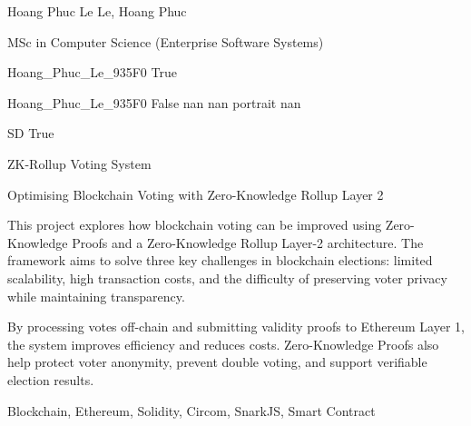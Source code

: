 
\begingroup{}\relax



\def\Key{Hoang_Phuc_Le_935F0}

{Hoang Phuc Le}
{Le, Hoang Phuc}

{MSc in Computer Science (Enterprise Software Systems)}

{Hoang_Phuc_Le_935F0}
{True}

{Hoang_Phuc_Le_935F0}
{False}
{nan}
{nan}
{portrait}
{nan}

{SD}
{True}

{ZK-Rollup Voting System}

{Optimising Blockchain Voting with Zero-Knowledge Rollup Layer 2}

{This project explores how blockchain voting can be improved using Zero-Knowledge Proofs and a Zero-Knowledge Rollup Layer-2 architecture. The framework aims to solve three key challenges in blockchain elections: limited scalability, high transaction costs, and the difficulty of preserving voter privacy while maintaining transparency.

By processing votes off-chain and submitting validity proofs to Ethereum Layer 1, the system improves efficiency and reduces costs. Zero-Knowledge Proofs also help protect voter anonymity, prevent double voting, and support verifiable election results.}

{Blockchain, Ethereum, Solidity, Circom, SnarkJS, Smart Contract}

